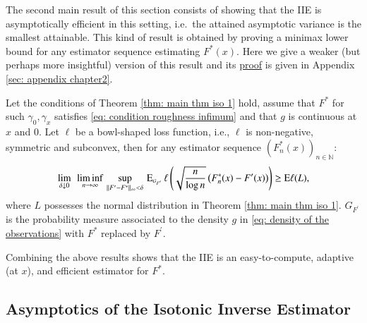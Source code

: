 The second main result of this section consists of showing that the IIE is asymptotically efficient in this setting, i.e.\ the attained asymptotic variance is the smallest attainable. This kind of result is obtained by proving a minimax lower bound for any estimator sequence estimating $F^*(x)$. Here we give a weaker (but perhaps more insightful) version of this result and its \hyperlink{proof of thm 2}{proof} is given in Appendix \ref{sec: appendix chapter2}. 

\begin{theorem}\label{thm: LAM weaker}
    Let the conditions of Theorem \ref{thm: main thm iso 1} hold, assume that $F^*$ for such $\gamma_0, \gamma_x$ satisfies \eqref{eq: condition roughness infimum} and that $g$ is continuous at $x$ and $0$. Let $\ell$ be a bowl-shaped loss function, i.e., $\ell$ is non-negative, symmetric and subconvex, then for any estimator sequence $\left( F^*_n(x)\right)_{n \in \mathbb{N}}$:
    \begin{align}\label{eq: LAM simplified}
        \lim_{\delta \downarrow 0} \: \: \liminf_{n \rightarrow \infty} \, \sup_{\| F^{\prime } - F^* \|_{\infty} < \delta} \, \ex_{\scriptscriptstyle{G_{{\scaleto{F^{\prime}}{3.7pt}}}}} \, \ell\left(\sqrt{\frac{n}{\log{n}}}\left(F^*_n(x)- F^{\prime}(x)\right)\right)  \geq \ex \ell(L),
    \end{align}
where $L$ possesses the normal distribution in Theorem \ref{thm: main thm iso 1}. $G_{F^\prime}$ is the probability measure associated to the density $g$ in \eqref{eq: density of the observations} with $F^*$ replaced by $F^\prime$.
\end{theorem}
Combining the above results shows that the IIE is an easy-to-compute, adaptive (at $x$), and efficient estimator for $F^*$.

\subsection{Asymptotics of the Isotonic Inverse Estimator}

